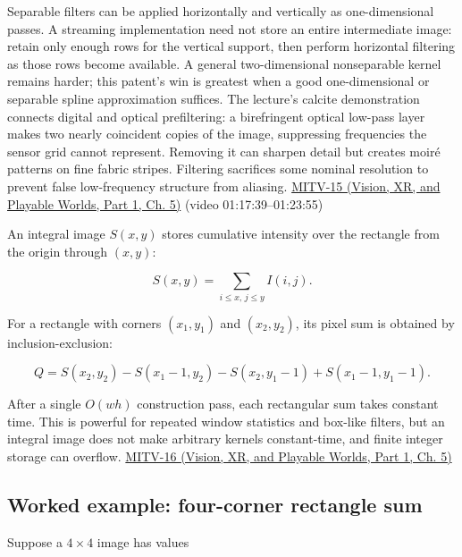 Separable filters can be applied horizontally and vertically as one-dimensional passes. A streaming implementation need not store an entire intermediate image: retain only enough rows for the vertical support, then perform horizontal filtering as those rows become available. A general two-dimensional nonseparable kernel remains harder; this patent's win is greatest when a good one-dimensional or separable spline approximation suffices. The lecture's calcite demonstration connects digital and optical prefiltering: a birefringent optical low-pass layer makes two nearly coincident copies of the image, suppressing frequencies the sensor grid cannot represent. Removing it can sharpen detail but creates moiré patterns on fine fabric stripes. Filtering sacrifices some nominal resolution to prevent false low-frequency structure from aliasing. \href{../07-Vision-XR-and-Playable-Worlds-P01/main.pdf\#nameddest=04-visual-computing-ii-ch036-mitv-15---alignment-patmax-distance-field-filtering-and-sub-sampling-us-7065262}{MITV-15 (Vision, XR, and Playable Worlds, Part 1, Ch. 5)} (video 01:17:39--01:23:55)

An integral image \(S(x,y)\) stores cumulative intensity over the rectangle from the origin through \((x,y)\):

\[
S(x,y)=\sum_{i\le x,\,j\le y}I(i,j).
\]

For a rectangle with corners \((x_1,y_1)\) and \((x_2,y_2)\), its pixel sum is obtained by inclusion-exclusion:

\[
Q=S(x_2,y_2)-S(x_1-1,y_2)-S(x_2,y_1-1)+S(x_1-1,y_1-1).
\]

After a single \(O(wh)\) construction pass, each rectangular sum takes constant time. This is powerful for repeated window statistics and box-like filters, but an integral image does not make arbitrary kernels constant-time, and finite integer storage can overflow. \href{../07-Vision-XR-and-Playable-Worlds-P01/main.pdf\#nameddest=04-visual-computing-ii-ch036-mitv-16---fast-convolution-low-pass-filter-approximations-integral-images-us-6457032}{MITV-16 (Vision, XR, and Playable Worlds, Part 1, Ch. 5)}

\begin{allmightroleexample}

\subsection{Worked example: four-corner rectangle sum}\label{03-visual-computing-i-ch004-worked-example-four-corner-rectangle-sum}

\hypertarget{03-visual-computing-i-ch004-worked-example-four-corner-rectangle-sum}{}

Suppose a \(4\times4\) image has values

\end{allmightroleexample}

